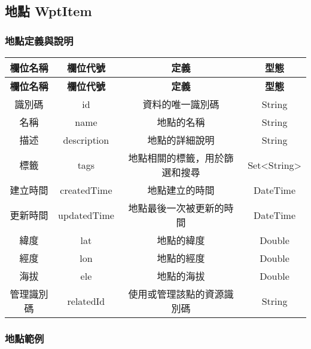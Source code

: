 \subsection{地點 WptItem}

\subsubsection{地點定義與說明}

\begin{longtable}{|c|c|c|c|}
  \hline
  \textbf{欄位名稱} & \textbf{欄位代號} & \textbf{定義} & \textbf{型態} \\
  \hline
  \endfirsthead
  \hline
  \textbf{欄位名稱} & \textbf{欄位代號} & \textbf{定義} & \textbf{型態} \\
  \hline
  \endhead
  
  識別碼 & id & 資料的唯一識別碼 & String \\
  \hline
  名稱 & name & 地點的名稱 & String \\
  \hline
  描述 & description & 地點的詳細說明 & String \\
  \hline
  標籤 & tags & 地點相關的標籤，用於篩選和搜尋 & Set<String> \\
  \hline
  建立時間 & createdTime & 地點建立的時間 & DateTime \\
  \hline
  更新時間 & updatedTime & 地點最後一次被更新的時間 & DateTime \\
  \hline
  緯度 & lat & 地點的緯度 & Double \\
  \hline
  經度 & lon & 地點的經度 & Double \\
  \hline
  海拔 & ele & 地點的海拔 & Double \\
  \hline
  管理識別碼 & relatedId & 使用或管理該點的資源識別碼 & String \\
  \hline
\end{longtable}

\subsubsection{地點範例}

